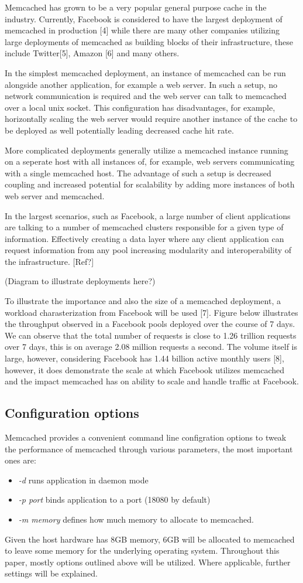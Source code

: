 Memcached has grown to be a very popular general purpose cache in the industry. Currently, Facebook is considered to have the largest deployment of memcached in production [4] while there are many other companies utilizing large deployments of memcached as building blocks of their infrastructure, these include Twitter[5], Amazon [6] and many others.

In the simplest memcached deployment, an instance of memcached can be run alongside another application, for example a web server. In such a setup, no network communication is required and the web server can talk to memcached over a local unix socket. This configuration has disadvantages, for example, horizontally scaling the web server would require another instance of the cache to be deployed as well potentially leading decreased cache hit rate.

More complicated deployments generally utilize a memcached instance running on a seperate host with all instances of, for example, web servers communicating with a single memcached host. The advantage of such a setup is decreased coupling and increased potential for scalability by adding more instances of both web server and memcached.

In the largest scenarios, such as Facebook, a large number of client applications are talking to a number of memcached clusters responsible for a given type of information. Effectively creating a data layer where any client application can request information from any pool increasing modularity and interoperability of the infrastructure. [Ref?]

(Diagram to illustrate deployments here?)

To illustrate the importance and also the size of a memcached deployment, a workload charasterization from Facebook will be used [7]. Figure below illustrates the throughput observed in a Facebook pools deployed over the course of 7 days. We can observe that the total number of requests is close to 1.26 trillion requests over 7 days, this is on average 2.08 million requests a second. The volume itself is large, however, considering Facebook has 1.44 billion active monthly users [8], however, it does demonstrate the scale at which Facebook utilizes memcached and the impact memcached has on ability to scale and handle traffic at Facebook.



\subsection{Configuration options}
Memcached provides a convenient command line configration options to tweak the performance of memcached through various parameters, the most important ones are:
\begin{itemize}
    \item \emph{-d} runs application in daemon mode
    \item \emph{-p port} binds application to a port (18080 by default)
    \item \emph{-m memory} defines how much memory to allocate to memcached.
\end{itemize}

Given the host hardware has 8GB memory, 6GB will be allocated to memcached to leave some memory for the underlying operating system. Throughout this paper, mostly options outlined above will be utilized. Where applicable, further settings will be explained.
